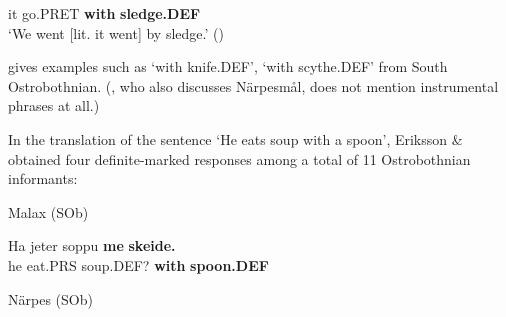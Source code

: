 

it  go.PRET  \textbf{with} \textbf{sledge.DEF}\\

\glt ‘We went [lit. it went] by sledge.’ (\citet[135]{Hummelstedt1934})

\z

\citet{Ivars2005} gives examples such as  ‘with knife.DEF’,   ‘with scythe.DEF’ from South Ostrobothnian. (\citet{Nikula1997}, who also discusses Närpesmål, does not mention instrumental phrases at all.)


In the translation of the sentence ‘He eats soup with a spoon’, Eriksson \& \citet{Rendahl1999} obtained four definite-marked responses among a total of 11 Ostrobothnian informants:


\item 


\item 

Malax (SOb)



 \ea\label{}
\gll Ha  jeter  soppu  \textbf{me}\textbf{  skeide.}\\


he  eat.PRS  soup.DEF?  \textbf{with} \textbf{spoon.DEF}\\

\item 

Närpes (SOb)

